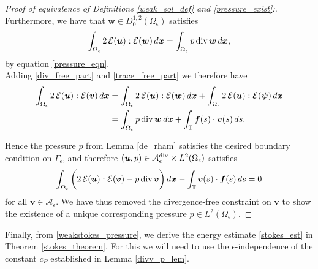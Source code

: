 \documentclass[11pt]{article}
\numberwithin{equation}{section}
\newcommand{\T}{\mathbb{T}}
\newcommand{\A}{\mathcal{A}}
\newcommand{\E}{\mathcal{E}}
\newcommand{\bu}{\bm{u}}
\newcommand{\bw}{\bm{w}}
\newcommand{\bx}{\bm{x}}
\newcommand{\bv}{\bm{v}}
\newcommand{\ts}{\thinspace}
\newcommand{\dive}{{\rm{div}}}
\theoremstyle{definition}
\begin{document}
\begin{proof}[Proof of equivalence of Definitions \ref{weak_sol_def} and \ref{pressure_exist}:]
Furthermore, we have that $\bw\in D_0^{1,2}(\Omega_{\epsilon})$ satisfies
\begin{equation}\label{trace_free_part}
\int_{\Omega_{\epsilon}} 2 \ts \E(\bu):\E(\bw) \ts d\bx = \int_{\Omega_{\epsilon}} p\ts \dive\ts\bw \ts d\bx,
\end{equation}
by equation \eqref{pressure_eqn}. \\

Adding \eqref{div_free_part} and \eqref{trace_free_part} we therefore have  
\begin{align*}
\int_{\Omega_{\epsilon}} 2 \ts \E(\bu):\E(\bv) \ts d\bx &= \int_{\Omega_{\epsilon}} 2 \ts \E(\bu):\E(\bw) \ts d\bx+\int_{\Omega_{\epsilon}} 2 \ts \E(\bu):\E({\bm \psi}) \ts d\bx \\
&= \int_{\Omega_{\epsilon}} p\ts \dive\ts\bw \ts d\bx + \int_{\T} {\bm f}(s)\cdot\bv(s) \ts ds.
\end{align*}

Hence the pressure $p$ from Lemma \ref{de_rham} satisfies the desired boundary condition on $\Gamma_{\epsilon}$, and therefore $(\bu,p)\in \A_{\epsilon}^{\dive}\times L^2(\Omega_{\epsilon})$ satisfies
\begin{equation}\label{weakstokes_pressure} 
\int_{\Omega_{\epsilon}} \bigg(2 \ts\mathcal{E}(\bu):\mathcal{E}(\bv) - p\ts\dive\ts \bv \bigg)\ts d\bx - \int_{\T} \bv(s)\cdot{\bm f}(s) \ts ds = 0
\end{equation}
for all $\bv \in \A_{\epsilon}$. We have thus removed the divergence-free constraint on $\bv$ to show the existence of a unique corresponding pressure $p\in L^2(\Omega_{\epsilon})$.
\end{proof} 

Finally, from \eqref{weakstokes_pressure}, we derive the energy estimate \eqref{stokes_est} in Theorem \ref{stokes_theorem}. For this we will need to use the $\epsilon$-independence of the constant $c_P$ established in Lemma \ref{divv_p_lem}. 
\end{document}
